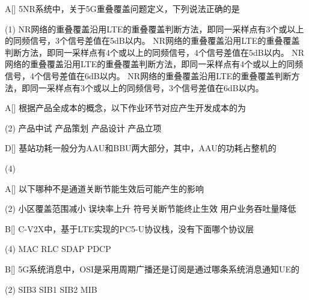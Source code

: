 \begin{choice}{A}[]
    5NR系统中，关于5G重叠覆盖问题定义，下列说法正确的是
    \begin{tasks}(1)
        \task NR网络的重叠覆盖沿用LTE的重叠覆盖判断方法，即同一采样点有3个或以上的同频信号，3个信号差值在5dB以内。
        \task NR网络的重叠覆盖沿用LTE的重叠覆盖判断方法，即同一采样点有4个或以上的同频信号，4个信号差值在5dB以内。
        \task NR网络的重叠覆盖沿用LTE的重叠覆盖判断方法，即同一采样点有4个或以上的同频信号，4个信号差值在6dB以内。
        \task NR网络的重叠覆盖沿用LTE的重叠覆盖判断方法，即同一采样点有3个或以上的同频信号，3个信号差值在6dB以内。
    \end{tasks}
\end{choice}



\begin{choice}{A}[]
    根据产品全成本的概念，以下作业环节对应产生开发成本的为
    \begin{tasks}(2)
        \task 产品中试
        \task 产品策划
        \task 产品设计
        \task 产品立项
    \end{tasks}
\end{choice}



\begin{choice}{D}[]
    基站功耗一般分为AAU和BBU两大部分，其中，AAU的功耗占整机的
    \begin{tasks}(4)
    \end{tasks}
\end{choice}




\begin{choice}{A}[]
    以下哪种不是通道关断节能生效后可能产生的影响
    \begin{tasks}(2)
        \task 小区覆盖范围减小
        \task 误块率上升
        \task 符号关断节能终止生效
        \task 用户业务吞吐量降低
    \end{tasks}
\end{choice}

\begin{choice}{B}[]
    C-V2X中，基于LTE实现的PC5-U协议栈，没有下面哪个协议层
    \begin{tasks}(4)
        \task MAC
        \task RLC
        \task SDAP
        \task PDCP
    \end{tasks}
\end{choice}

\begin{choice}{B}[]
    5G系统消息中，OSI是采用周期广播还是订阅是通过哪条系统消息通知UE的
    \begin{tasks}(2)
        \task SIB3
        \task SIB1
        \task SIB2
        \task MIB
    \end{tasks}
\end{choice}


